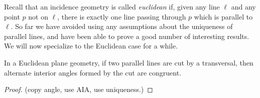 \documentclass{article}
\begin{document}

Recall that an incidence geometry is called \emph{euclidean} if, given any line $\ell$ and any point $p$ not on $\ell$, there is exactly one line passing through $p$ which is parallel to $\ell$. So far we have avoided using any assumptions about the uniqueness of parallel lines, and have been able to prove a good number of interesting results. We will now specialize to the Euclidean case for a while.

\begin{prop}
In a Euclidean plane geometry, if two parallel lines are cut by a transversal, then alternate interior angles formed by the cut are congruent.
\end{prop}

\begin{proof}
(copy angle, use AIA, use uniqueness.)
\end{proof}
\end{document}
